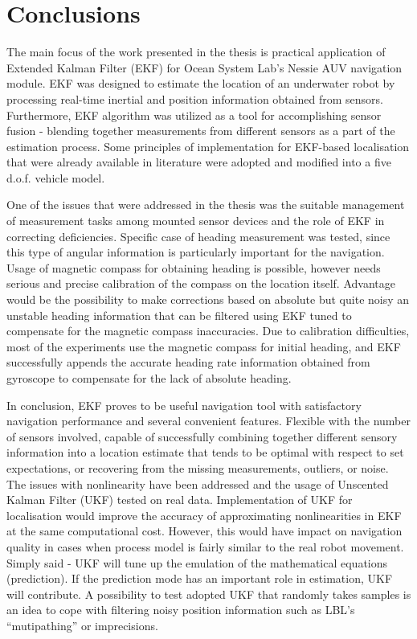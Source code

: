 \chapter{Conclusions} \label{chap:conclusions}
The main focus of the work presented in the thesis is practical application of Extended Kalman Filter (EKF) for Ocean System Lab's Nessie AUV navigation module. EKF was designed to estimate the location of an underwater robot by processing real-time inertial and position information obtained from sensors. Furthermore, EKF algorithm was utilized as a tool for accomplishing sensor fusion - blending together measurements from different sensors as a part of the estimation process. Some principles of implementation for EKF-based localisation that were already available in literature were adopted and modified into a five d.o.f. vehicle model.

One of the issues that were addressed in the thesis was the suitable management of measurement tasks among mounted sensor devices and the role of EKF in correcting deficiencies. Specific case of heading measurement was tested, since this type of angular information is particularly important for the navigation. Usage of magnetic compass for obtaining heading is possible, however needs serious and precise calibration of the compass on the location itself. Advantage would be the possibility to make corrections based on absolute but quite noisy an unstable heading information that can be filtered using EKF tuned to compensate for the magnetic compass inaccuracies. Due to calibration difficulties, most of the experiments use the magnetic compass for initial heading, and EKF successfully appends the accurate heading rate information obtained from gyroscope to compensate for the lack of absolute heading. 

In conclusion, EKF proves to be useful navigation tool with satisfactory navigation performance and several convenient features. Flexible with the number of sensors involved, capable of successfully combining together different sensory information into a location estimate that tends to be optimal with respect to set expectations, or recovering from the missing measurements, outliers, or noise. The issues with nonlinearity have been addressed and the usage of Unscented Kalman Filter (UKF) tested on real data. Implementation of UKF for localisation would improve the accuracy of approximating nonlinearities in EKF at the same computational cost. However, this would have impact on navigation quality in cases when process model is fairly similar to the real robot movement. Simply said - UKF will tune up the emulation of the mathematical equations (prediction). If the prediction mode has an important role in estimation, UKF will contribute. A possibility to test adopted UKF that randomly takes samples is an idea to cope with filtering noisy position information such as LBL's ``mutipathing'' or imprecisions.      

